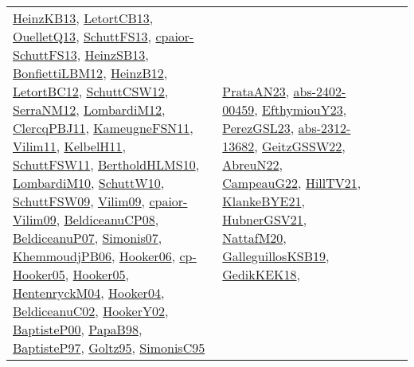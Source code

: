 {\begin{longtable}{llp{6cm}p{6cm}p{6cm}}
\href{papers/HeinzKB13.pdf}{HeinzKB13}\cite{HeinzKB13}, \href{papers/LetortCB13.pdf}{LetortCB13}\cite{LetortCB13}, \href{papers/OuelletQ13.pdf}{OuelletQ13}\cite{OuelletQ13}, \href{papers/SchuttFS13.pdf}{SchuttFS13}\cite{SchuttFS13}, \href{papers/cpaior-SchuttFS13.pdf}{cpaior-SchuttFS13}\cite{cpaior-SchuttFS13}, \href{articles/HeinzSB13.pdf}{HeinzSB13}\cite{HeinzSB13}, \href{papers/BonfiettiLBM12.pdf}{BonfiettiLBM12}\cite{BonfiettiLBM12}, \href{papers/HeinzB12.pdf}{HeinzB12}\cite{HeinzB12}, \href{papers/LetortBC12.pdf}{LetortBC12}\cite{LetortBC12}, \href{papers/SchuttCSW12.pdf}{SchuttCSW12}\cite{SchuttCSW12}, \href{papers/SerraNM12.pdf}{SerraNM12}\cite{SerraNM12}, \href{articles/LombardiM12.pdf}{LombardiM12}\cite{LombardiM12}, \href{papers/ClercqPBJ11.pdf}{ClercqPBJ11}\cite{ClercqPBJ11}, \href{papers/KameugneFSN11.pdf}{KameugneFSN11}\cite{KameugneFSN11}, \href{papers/Vilim11.pdf}{Vilim11}\cite{Vilim11}, \href{articles/KelbelH11.pdf}{KelbelH11}\cite{KelbelH11}, \href{articles/SchuttFSW11.pdf}{SchuttFSW11}\cite{SchuttFSW11}, \href{papers/BertholdHLMS10.pdf}{BertholdHLMS10}\cite{BertholdHLMS10}, \href{papers/LombardiM10.pdf}{LombardiM10}\cite{LombardiM10}, \href{papers/SchuttW10.pdf}{SchuttW10}\cite{SchuttW10}, \href{papers/SchuttFSW09.pdf}{SchuttFSW09}\cite{SchuttFSW09}, \href{papers/Vilim09.pdf}{Vilim09}\cite{Vilim09}, \href{papers/cpaior-Vilim09.pdf}{cpaior-Vilim09}\cite{cpaior-Vilim09}, \href{papers/BeldiceanuCP08.pdf}{BeldiceanuCP08}\cite{BeldiceanuCP08}, \href{papers/BeldiceanuP07.pdf}{BeldiceanuP07}\cite{BeldiceanuP07}, \href{articles/Simonis07.pdf}{Simonis07}\cite{Simonis07}, \href{papers/KhemmoudjPB06.pdf}{KhemmoudjPB06}\cite{KhemmoudjPB06}, \href{articles/Hooker06.pdf}{Hooker06}\cite{Hooker06}, \href{papers/cp-Hooker05.pdf}{cp-Hooker05}\cite{cp-Hooker05}, \href{articles/Hooker05.pdf}{Hooker05}\cite{Hooker05}, \href{papers/HentenryckM04.pdf}{HentenryckM04}\cite{HentenryckM04}, \href{papers/Hooker04.pdf}{Hooker04}\cite{Hooker04}, \href{papers/BeldiceanuC02.pdf}{BeldiceanuC02}\cite{BeldiceanuC02}, \href{papers/HookerY02.pdf}{HookerY02}\cite{HookerY02}, \href{articles/BaptisteP00.pdf}{BaptisteP00}\cite{BaptisteP00}, \href{articles/PapaB98.pdf}{PapaB98}\cite{PapaB98}, \href{papers/BaptisteP97.pdf}{BaptisteP97}\cite{BaptisteP97}, \href{papers/Goltz95.pdf}{Goltz95}\cite{Goltz95}, \href{papers/SimonisC95.pdf}{SimonisC95}\cite{SimonisC95} & \href{articles/PrataAN23.pdf}{PrataAN23}\cite{PrataAN23}, \href{articles/abs-2402-00459.pdf}{abs-2402-00459}\cite{abs-2402-00459}, \href{papers/EfthymiouY23.pdf}{EfthymiouY23}\cite{EfthymiouY23}, \href{papers/PerezGSL23.pdf}{PerezGSL23}\cite{PerezGSL23}, \href{articles/abs-2312-13682.pdf}{abs-2312-13682}\cite{abs-2312-13682}, \href{papers/GeitzGSSW22.pdf}{GeitzGSSW22}\cite{GeitzGSSW22}, \href{articles/AbreuN22.pdf}{AbreuN22}\cite{AbreuN22}, \href{articles/CampeauG22.pdf}{CampeauG22}\cite{CampeauG22}, \href{papers/HillTV21.pdf}{HillTV21}\cite{HillTV21}, \href{papers/KlankeBYE21.pdf}{KlankeBYE21}\cite{KlankeBYE21}, \href{articles/HubnerGSV21.pdf}{HubnerGSV21}\cite{HubnerGSV21}, \href{papers/NattafM20.pdf}{NattafM20}\cite{NattafM20}, \href{papers/GalleguillosKSB19.pdf}{GalleguillosKSB19}\cite{GalleguillosKSB19}, \href{articles/GedikKEK18.pdf}{GedikKEK18}\cite{GedikKEK18}, 
\end{longtable}}
